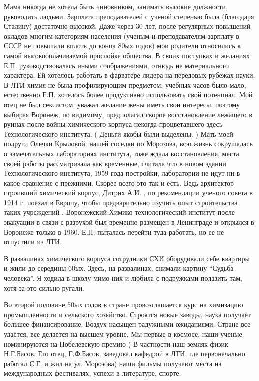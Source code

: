 Мама никогда не хотела быть чиновником, занимать высокие должности, руководить людьми. Зарплата преподавателей с ученой степенью была (благодаря Сталину) достаточно высокой. Даже через 30 лет, после регулярных повышений окладов многим категориям населения (ученым и преподавателям зарплату в СССР не повышали вплоть до конца 80ых годов) мои родители относились к самой высокооплачиваемой прослойке общества. В своих поступках и желаниях Е.П. руководствовалась иными соображениями, отнюдь не материального характера. Ей хотелось работать в фарватере лидера на передовых рубежах науки. В ЛТИ химия не была профилирующим предметом, учебных часов было мало, естественно Е.П. хотелось более продуктивно использовать свой потенциал. Мой отец не был сексистом, уважал желание жены иметь свои интересы, поэтому выбирая Воронеж, по видимому, предполагал скорое восстановление лежащего в руинах после войны химического корпуса некогда процветавшего здесь Технологического института. ( Деньги якобы  были выделены. ) Мать моей подруги Олечки Крыловой, нашей соседки по  Морозова, всю жизнь сокрушалась о замечательных лабораториях института, тоже ждала восстановления, места своей работы рассматривала как временные, считала что в новом здании Технологического института, 1959 года постройки, лаборатории не идут ни в какое сравнение с прежними. Скорее всего это так и есть. Ведь архитектор строивший химический корпус, Дитрих А.И. , по рекомендации ученого совета в 1914 г. поехал в Европу, чтобы предварительно изучить опыт строительства  таких учреждений . Воронежский Химико-технологический институт после эвакуации в связи с разрухой был временно размещен в Ленинграде и открылся  в Воронеже только в 1960. Е.П. пыталась перейти туда работать, но ее не отпустили из ЛТИ.

В развалинах химического корпуса сотрудники СХИ оборудовали себе квартиры и жили до середины 60ых. Здесь, на развалинах, снимали картину “Судьба человека”. Я ходила в школу мимо них и любила с подружками полазить там, хотя за это сильно ругали.

Во второй половине 50ых годов в стране провозглашается курс на химизацию промышленности и сельского хозяйство. Строятся новые заводы, наука получает большее финансирование. Воздух насыщен радужными ожиданиями. Стране все удаётся, все делается на высшем уровне. Мы первые в космосе, наши ученые номинируются на Нобелевскую премию ( В частности наш земляк физик Н.Г.Басов. Его отец, Г.Ф.Басов, заведовал кафедрой в ЛТИ, где первоначально работал С.Г. и жил на ул. Морозова) наши фильмы получают места на международных фестивалях, успехи в литературе, спорте.

